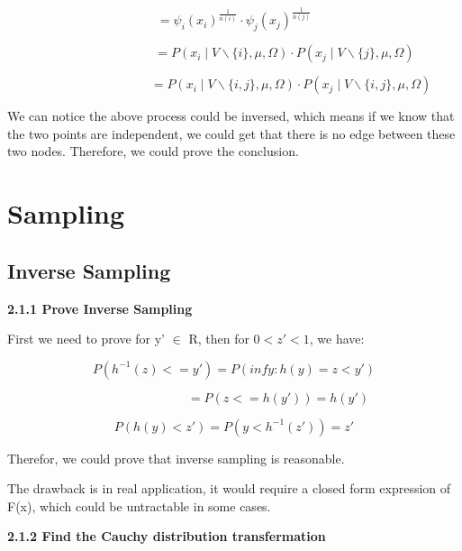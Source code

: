 \documentclass{article} %
\begin{document}
\begin{equation}
=
\psi_i (x_i)^{\frac{1}{n(i)}}
\cdot \psi_j (x_j)^{\frac{1}{n(j)}}
\end{equation}

\begin{equation}
\qquad \qquad \qquad \qquad =
P (x_i\mid V\backslash\{i\}, \mu, \Omega)
\cdot P (x_j\mid V\backslash\{j\}, \mu, \Omega)
\end{equation}

\begin{equation}
\qquad \qquad \qquad \qquad \quad =
P (x_i\mid V\backslash\{i,j\}, \mu, \Omega)
\cdot P (x_j\mid V\backslash\{i,j\}, \mu, \Omega)
\end{equation}

We can notice the above process could be inversed, which means if we know that
the two points are independent, we could get that there is no edge between these
two nodes. Therefore, we could prove the conclusion.



\section{Sampling}


\subsection{Inverse Sampling}
\textbf{2.1.1 Prove Inverse Sampling}

First we need to prove for y' $\in$ R, then for $0 < z'< 1$, we have:

\begin{equation}
P (h^{-1} (z) <= y') = P (inf {y: h(y) = z} < y')
\end{equation}

\begin{equation}
\qquad \qquad \qquad \quad =
P (z <= h(y')) = h (y')
\end{equation}

\begin{equation}
P(h(y) < z') = P(y < h^{-1} (z')) = z'
\end{equation}

Therefor, we could prove that inverse sampling is reasonable.

The drawback is in real application, it would require a closed form
expression of F(x), which could be untractable in some cases.

\textbf{2.1.2 Find the Cauchy distribution transfermation}
\end{document}
